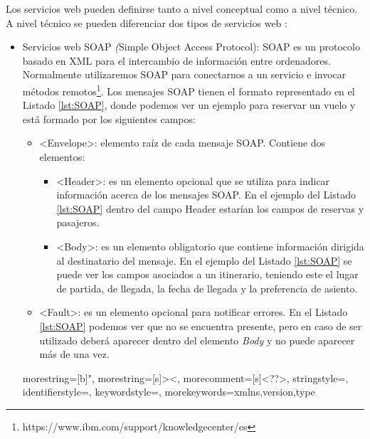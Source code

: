 Los servicios web pueden definirse tanto a nivel conceptual como a nivel técnico. A nivel técnico se pueden diferenciar dos tipos de servicios web \citep{TorresJoaquin2017SC}:
\begin{itemize}
	\item Servicios web SOAP \textit({Simple Object Access Protocol}): SOAP es un protocolo basado en XML para el intercambio de información entre ordenadores. Normalmente utilizaremos SOAP para conectarnos a un servicio e invocar métodos remotos\footnote{https://www.ibm.com/support/knowledgecenter/es}. Los mensajes SOAP tienen el formato representado en el Listado \ref{lst:SOAP}, donde podemos ver un ejemplo para reservar un vuelo y está formado por los siguientes campos:
	
		\begin{itemize}
		\item <Envelope>: elemento raíz de cada mensaje SOAP. Contiene dos elementos: 
			\begin{itemize}
			\item <Header>: es un elemento opcional que se utiliza para indicar información acerca de los mensajes SOAP. En el ejemplo del Listado \ref{lst:SOAP} dentro del campo Header estarían los campos de reservas y pasajeros.
			\item <Body>: es un elemento obligatorio que contiene información dirigida al destinatario del mensaje. En el ejemplo del Listado \ref{lst:SOAP} se puede ver los campos asociados a un itinerario, teniendo este el lugar de partida, de llegada, la fecha de llegada y la preferencia de asiento.
		\end{itemize}
		\item <Fault>: es un elemento opcional para notificar errores. En el Listado \ref{lst:SOAP} podemos ver que no se encuentra presente, pero en caso de ser utilizado deberá aparecer dentro del elemento \textit{Body} y no puede aparecer más de una vez.
		
	\end{itemize}
	
	
	
	
	
	{
		morestring=[b]",
		morestring=[s]{>}{<},
		morecomment=[s]{<?}{?>},
		stringstyle=\color{black},
		identifierstyle=\color{darkblue},
		keywordstyle=\color{purple},
		morekeywords={xmlns,version,type}%
	}
	

\end{itemize}
